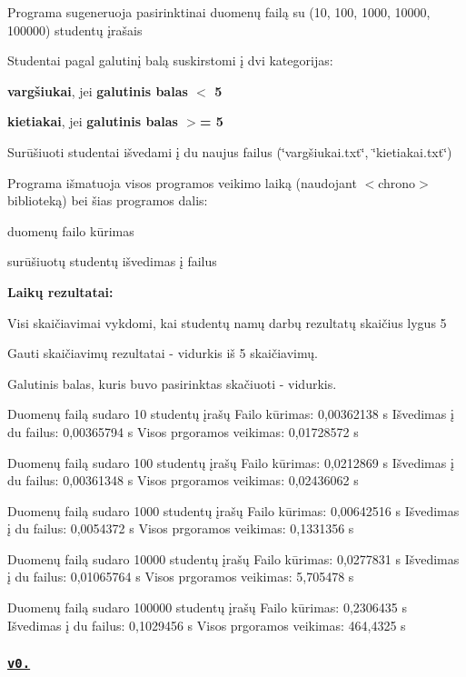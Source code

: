 \begin{DoxyItemize}
\item Programa sugeneruoja pasirinktinai duomenų failą su (10, 100, 1000, 10000, 100000) studentų įrašais
\item Studentai pagal galutinį balą suskirstomi į dvi kategorijas\+:
\begin{DoxyItemize}
\item {\bfseries vargšiukai}, jei {\bfseries galutinis balas $<$ 5}
\item {\bfseries kietiakai}, jei {\bfseries galutinis balas $>$= 5}
\end{DoxyItemize}
\item Surūšiuoti studentai išvedami į du naujus failus ({\ttfamily \char`\"{}vargšiukai.\+txt\char`\"{}}, {\ttfamily \char`\"{}kietiakai.\+txt\char`\"{}})
\item Programa išmatuoja visos programos veikimo laiką (naudojant {\ttfamily $<$chrono$>$} biblioteką) bei šias programos dalis\+:
\begin{DoxyItemize}
\item duomenų failo kūrimas
\item surūšiuotų studentų išvedimas į failus
\end{DoxyItemize}
\end{DoxyItemize}

{\bfseries Laikų rezultatai\+:}
\begin{DoxyItemize}
\item Visi skaičiavimai vykdomi, kai studentų namų darbų rezultatų skaičius lygus 5
\item Gauti skaičiavimų rezultatai -\/ vidurkis iš 5 skaičiavimų.
\item Galutinis balas, kuris buvo pasirinktas skačiuoti -\/ vidurkis. 
\begin{DoxyCode}
Duomenų failą sudaro 10 studentų įrašų
Failo kūrimas:            0,00362138 s
Išvedimas į du failus:    0,00365794 s
Visos prgoramos veikimas: 0,01728572 s

Duomenų failą sudaro 100 studentų įrašų
Failo kūrimas:            0,0212869 s
Išvedimas į du failus:    0,00361348 s
Visos prgoramos veikimas: 0,02436062 s

Duomenų failą sudaro 1000 studentų įrašų
Failo kūrimas:            0,00642516 s
Išvedimas į du failus:    0,0054372 s
Visos prgoramos veikimas: 0,1331356 s

Duomenų failą sudaro 10000 studentų įrašų
Failo kūrimas:            0,0277831 s
Išvedimas į du failus:    0,01065764 s
Visos prgoramos veikimas: 5,705478 s

Duomenų failą sudaro 100000 studentų įrašų
Failo kūrimas:            0,2306435 s
Išvedimas į du failus:    0,1029456 s
Visos prgoramos veikimas: 464,4325 s
\end{DoxyCode}
 \subsubsection*{\href{https://github.com/KlauMack/Duomenu_apdorojimas/releases/tag/v0.3}{\tt v0.}}
\end{DoxyItemize}

